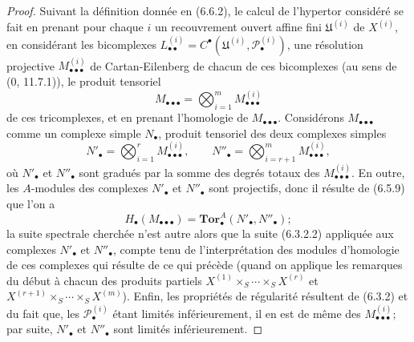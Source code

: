 \begin{proof}
Suivant la définition donnée en (6.6.2), le calcul de l'hypertor considéré se
fait en prenant pour chaque $i$ un recouvrement ouvert affine fini
$\mathfrak U^{(i)}$ de $X^{(i)}$, en considérant les bicomplexes
$L_{\bullet\bullet}^{(i)}=C^\bullet(\mathfrak U^{(i)},
\mathscr P_\bullet^{(i)})$, une résolution projective
$M_{\bullet\bullet\bullet}^{(i)}$ de Cartan-Eilenberg de chacun de ces
bicomplexes (au sens de (0, 11.7.1)), le produit tensoriel
\[
  M_{\bullet\bullet\bullet}
  =\bigotimes_{i=1}^m M_{\bullet\bullet\bullet}^{(i)}
\]
de ces tricomplexes, et en prenant l'homologie de
$M_{\bullet\bullet\bullet}$. Considérons $M_{\bullet\bullet\bullet}$ comme
un complexe simple $N_\bullet$, produit tensoriel des deux complexes simples
\[
  N'_\bullet=\bigotimes_{i=1}^r M_{\bullet\bullet\bullet}^{(i)},
  \qquad
  N''_\bullet=\bigotimes_{i=r+1}^m M_{\bullet\bullet\bullet}^{(i)},
\]
où $N'_\bullet$ et $N''_\bullet$ sont gradués par la somme des degrés totaux
des $M_{\bullet\bullet\bullet}^{(i)}$. En outre, les $A$-modules des
complexes $N'_\bullet$ et $N''_\bullet$ sont projectifs, donc il résulte de
(6.5.9) que l'on a
\[
  H_\bullet(M_{\bullet\bullet\bullet})
  =\mathbf{Tor}_\bullet^A(N'_\bullet,N''_\bullet);
\]
la suite spectrale cherchée n'est autre alors que la suite (6.3.2.2)
appliquée aux complexes $N'_\bullet$ et $N''_\bullet$, compte tenu de
l'interprétation des modules d'homologie de ces complexes qui résulte de ce
qui précède (quand on applique les remarques du début à chacun des produits
partiels
$X^{(1)}\times_S\cdots\times_S X^{(r)}$ et
$X^{(r+1)}\times_S\cdots\times_S X^{(m)}$). Enfin, les propriétés de
régularité résultent de (6.3.2) et du fait que, les
$\mathscr P_\bullet^{(i)}$ étant limités inférieurement, il en est de même
des $M_{\bullet\bullet\bullet}^{(i)}$; par suite, $N'_\bullet$ et
$N''_\bullet$ sont limités inférieurement.
\end{proof}

